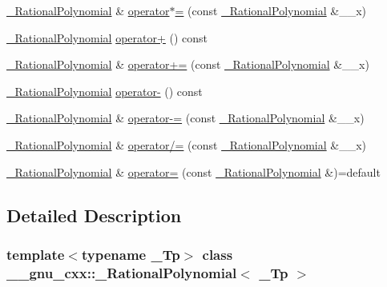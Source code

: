 \begin{DoxyCompactItemize}
\item 
\hyperlink{class____gnu__cxx_1_1__RationalPolynomial}{\+\_\+\+Rational\+Polynomial} \& \hyperlink{class____gnu__cxx_1_1__RationalPolynomial_a3905ba0616e848fb7daa18dd01481b78}{operator$\ast$=} (const \hyperlink{class____gnu__cxx_1_1__RationalPolynomial}{\+\_\+\+Rational\+Polynomial} \&\+\_\+\+\_\+x)
\item 
\hyperlink{class____gnu__cxx_1_1__RationalPolynomial}{\+\_\+\+Rational\+Polynomial} \hyperlink{class____gnu__cxx_1_1__RationalPolynomial_af027ee02f3bcd373e420eacec639a596}{operator+} () const
\item 
\hyperlink{class____gnu__cxx_1_1__RationalPolynomial}{\+\_\+\+Rational\+Polynomial} \& \hyperlink{class____gnu__cxx_1_1__RationalPolynomial_a04b822ad014e4c38bcaf609b48176c13}{operator+=} (const \hyperlink{class____gnu__cxx_1_1__RationalPolynomial}{\+\_\+\+Rational\+Polynomial} \&\+\_\+\+\_\+x)
\item 
\hyperlink{class____gnu__cxx_1_1__RationalPolynomial}{\+\_\+\+Rational\+Polynomial} \hyperlink{class____gnu__cxx_1_1__RationalPolynomial_a21c445f37dbceb2832ab1eebf5d2d965}{operator-\/} () const
\item 
\hyperlink{class____gnu__cxx_1_1__RationalPolynomial}{\+\_\+\+Rational\+Polynomial} \& \hyperlink{class____gnu__cxx_1_1__RationalPolynomial_ad233308f7f97d2658486b5eae84f90a5}{operator-\/=} (const \hyperlink{class____gnu__cxx_1_1__RationalPolynomial}{\+\_\+\+Rational\+Polynomial} \&\+\_\+\+\_\+x)
\item 
\hyperlink{class____gnu__cxx_1_1__RationalPolynomial}{\+\_\+\+Rational\+Polynomial} \& \hyperlink{class____gnu__cxx_1_1__RationalPolynomial_aa730392e9487843aad01fb28328ce032}{operator/=} (const \hyperlink{class____gnu__cxx_1_1__RationalPolynomial}{\+\_\+\+Rational\+Polynomial} \&\+\_\+\+\_\+x)
\item 
\hyperlink{class____gnu__cxx_1_1__RationalPolynomial}{\+\_\+\+Rational\+Polynomial} \& \hyperlink{class____gnu__cxx_1_1__RationalPolynomial_afa1efd00dfffcf6851bac3da7ba399dc}{operator=} (const \hyperlink{class____gnu__cxx_1_1__RationalPolynomial}{\+\_\+\+Rational\+Polynomial} \&)=default
\end{DoxyCompactItemize}


\subsection{Detailed Description}
\subsubsection*{template$<$typename \+\_\+\+Tp$>$\newline
class \+\_\+\+\_\+gnu\+\_\+cxx\+::\+\_\+\+Rational\+Polynomial$<$ \+\_\+\+Tp $>$}



